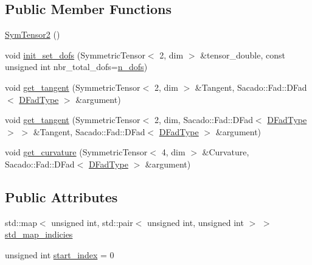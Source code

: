 \subsection*{Public Member Functions}
\begin{DoxyCompactItemize}
\item 
\hyperlink{classSacado__Wrapper_1_1SymTensor2_ae43e523ee18d7bf678e5d426df92cd49}{Sym\+Tensor2} ()
\item 
void \hyperlink{classSacado__Wrapper_1_1SymTensor2_a54495897cfdd887d0081015571a28107}{init\+\_\+set\+\_\+dofs} (Symmetric\+Tensor$<$ 2, dim $>$ \&tensor\+\_\+double, const unsigned int nbr\+\_\+total\+\_\+dofs=\hyperlink{classSacado__Wrapper_1_1SymTensor2_ad9d6542de5481e0d41bd1831cb0aeaff}{n\+\_\+dofs})
\item 
void \hyperlink{classSacado__Wrapper_1_1SymTensor2_aad13518e282739f93126adb9db351474}{get\+\_\+tangent} (Symmetric\+Tensor$<$ 2, dim $>$ \&Tangent, Sacado\+::\+Fad\+::\+D\+Fad$<$ \hyperlink{Sacado__Wrapper_8h_a7e0893207b87dad05c66a34baac8ed2e}{D\+Fad\+Type} $>$ \&argument)
\item 
void \hyperlink{classSacado__Wrapper_1_1SymTensor2_a7cd555be3d8c00559af7954671f417fa}{get\+\_\+tangent} (Symmetric\+Tensor$<$ 2, dim, Sacado\+::\+Fad\+::\+D\+Fad$<$ \hyperlink{Sacado__Wrapper_8h_a7e0893207b87dad05c66a34baac8ed2e}{D\+Fad\+Type} $>$ $>$ \&Tangent, Sacado\+::\+Fad\+::\+D\+Fad$<$ \hyperlink{Sacado__Wrapper_8h_a7e0893207b87dad05c66a34baac8ed2e}{D\+Fad\+Type} $>$ \&argument)
\item 
void \hyperlink{classSacado__Wrapper_1_1SymTensor2_aeff4168705676c8f8c050e9ea1fc46be}{get\+\_\+curvature} (Symmetric\+Tensor$<$ 4, dim $>$ \&Curvature, Sacado\+::\+Fad\+::\+D\+Fad$<$ \hyperlink{Sacado__Wrapper_8h_a7e0893207b87dad05c66a34baac8ed2e}{D\+Fad\+Type} $>$ \&argument)
\end{DoxyCompactItemize}
\subsection*{Public Attributes}
\begin{DoxyCompactItemize}
\item 
std\+::map$<$ unsigned int, std\+::pair$<$ unsigned int, unsigned int $>$ $>$ \hyperlink{classSacado__Wrapper_1_1SymTensor2_a1c6b89438714315ae209f4687b687505}{std\+\_\+map\+\_\+indicies}
\item 
unsigned int \hyperlink{classSacado__Wrapper_1_1SymTensor2_ab14d036243a7505e918af354b1cb74d9}{start\+\_\+index} = 0
\end{DoxyCompactItemize}
